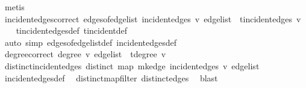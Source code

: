 \begin{isabellebody}
\ metis%
\endisatagproof
{\isafoldproof}%
%
\isadelimproof
\isanewline
%
\endisadelimproof
\isanewline
{}\isamarkupfalse%
\ incident{\isacharunderscore}{\kern0pt}edges{\isacharunderscore}{\kern0pt}correct{\isacharcolon}{\kern0pt}\ {\isachardoublequoteopen}edges{\isacharunderscore}{\kern0pt}of{\isacharunderscore}{\kern0pt}edge{\isacharunderscore}{\kern0pt}list\ {\isacharparenleft}{\kern0pt}incident{\isacharunderscore}{\kern0pt}edges\ v\ edge{\isacharunderscore}{\kern0pt}list{\isacharparenright}{\kern0pt}\ {\isacharequal}{\kern0pt}\ t{\isachardot}{\kern0pt}incident{\isacharunderscore}{\kern0pt}edges\ v{\isachardoublequoteclose}\isanewline
%
\isadelimproof
\ \ %
\endisadelimproof
%
\isatagproof
{}\isamarkupfalse%
\ t{\isachardot}{\kern0pt}incident{\isacharunderscore}{\kern0pt}edges{\isacharunderscore}{\kern0pt}def\ t{\isachardot}{\kern0pt}incident{\isacharunderscore}{\kern0pt}def\ \isamarkupfalse%
\ {\isacharparenleft}{\kern0pt}auto\ simp{\isacharcolon}{\kern0pt}\ edges{\isacharunderscore}{\kern0pt}of{\isacharunderscore}{\kern0pt}edge{\isacharunderscore}{\kern0pt}list{\isacharunderscore}{\kern0pt}def\ incident{\isacharunderscore}{\kern0pt}edges{\isacharunderscore}{\kern0pt}def{\isacharparenright}{\kern0pt}%
\endisatagproof
{\isafoldproof}%
%
\isadelimproof
\isanewline
%
\endisadelimproof
\isanewline
{}\isamarkupfalse%
\ degree{\isacharunderscore}{\kern0pt}correct{\isacharcolon}{\kern0pt}\ {\isachardoublequoteopen}degree\ v\ edge{\isacharunderscore}{\kern0pt}list\ {\isacharequal}{\kern0pt}\ t{\isachardot}{\kern0pt}degree\ v{\isachardoublequoteclose}\isanewline
%
\isadelimproof
%
\endisadelimproof
%
\isatagproof
{}\isamarkupfalse%
{\isacharminus}{\kern0pt}\isanewline
\ \ \isamarkupfalse%
\ distinct{\isacharunderscore}{\kern0pt}incident{\isacharunderscore}{\kern0pt}edges{\isacharcolon}{\kern0pt}\ {\isachardoublequoteopen}distinct\ {\isacharparenleft}{\kern0pt}map\ mk{\isacharunderscore}{\kern0pt}edge\ {\isacharparenleft}{\kern0pt}incident{\isacharunderscore}{\kern0pt}edges\ v\ edge{\isacharunderscore}{\kern0pt}list{\isacharparenright}{\kern0pt}{\isacharparenright}{\kern0pt}{\isachardoublequoteclose}\ \isamarkupfalse%
\ incident{\isacharunderscore}{\kern0pt}edges{\isacharunderscore}{\kern0pt}def\ \isamarkupfalse%
\ distinct{\isacharunderscore}{\kern0pt}map{\isacharunderscore}{\kern0pt}filter\ distinct{\isacharunderscore}{\kern0pt}edges\ \isamarkupfalse%
\ blast\isanewline
\ \ \isamarkupfalse%

\end{isabellebody}
